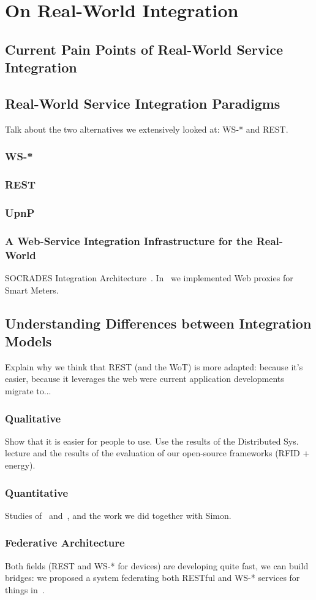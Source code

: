 \chapter{On Real-World Integration}

\section{Current Pain Points of Real-World Service Integration}


\section{Real-World Service Integration Paradigms}
Talk about the two alternatives we extensively looked at: WS-* and REST.

    \subsection{WS-*}
    \subsection{REST}
    \subsection{UpnP}
    \subsection{A Web-Service Integration Infrastructure for the Real-World}
    SOCRADES Integration Architecture~\cite{souza_socrades:_2008,guinard_tsc}.  In~\cite{dominique_guinard_are_2009} we implemented Web proxies for Smart Meters.

  \section{Understanding Differences between Integration Models}
Explain why we think that REST (and the WoT) is more adapted: because it's easier, because it leverages the web were current application developments migrate to...

    \subsection{Qualitative}
    Show that it is easier for people to use. Use the results of the Distributed Sys. lecture and the results of the evaluation of our open-source frameworks (RFID + energy).

    \subsection{Quantitative}
    Studies of~\cite{Guinard09} and~\cite{guinard_giving_2010}, and the work we did together with Simon.

    \subsection{Federative Architecture}
    Both fields (REST and WS-* for devices) are developing quite fast, we can build bridges: we proposed a system federating both RESTful and WS-* services for things in~\cite{guinard_interacting_2010}.